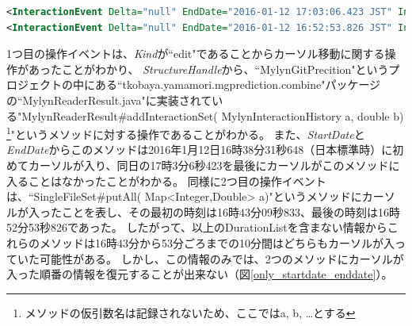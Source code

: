 \documentclass[a4paper]{jsbook}
\begin{document}
\begin{lstlisting}[float, floatplacement=tb, style=normalsize, language=xml, caption=拡張されたMylynによって記録されたMylynログの例（ただしXML上で実体参照に変換された文字はもとに戻している）, label=durationlist_fig]
<InteractionEvent Delta="null" EndDate="2016-01-12 17:03:06.423 JST" Interest="15.0" Kind="edit" Navigation="null" OriginId="org.eclipse.jdt.ui.CompilationUnitEditor" StartDate="2016-01-12 16:38:31.648 JST" StructureHandle="=MylynGitPrediction/src<tkobaya.yamamori.mgprediction.combine{MylynReaderResult.java[MylynReaderResult~ addInteractionSet~QMylynInteractionHistory;~D" StructureKind="java" NumEvents="15" CreationCount="103" DurationList= "[2016-01-12 16:38:31.648 JST/2016-01-12 16:40:16.482 JST/modified, 2016-01-12 17:02:58.409 JST/2016-01-12 17:03:06.423 JST/modified]"/>
<InteractionEvent Delta="null" EndDate="2016-01-12 16:52:53.826 JST" Interest="29.0" Kind="edit" Navigation="null" OriginId="org.eclipse.jdt.ui.CompilationUnitEditor" StartDate="2016-01-12 16:43:09.833 JST" StructureHandle="= MylynGitPrediction/src<tkobaya.yamamori.mgprediction.combine{SingleFileSet.java[SingleFileSet~putAll~QMap<+QInteger;+QDouble;>;" StructureKind="java" NumEvents="29" CreationCount="157" DurationList=" [2016-01-12 16:43:09.833 JST/2016-01-12 16:43:11.666 JST/referred, 2016-01-12 16:51:14.131 JST/2016-01-12 16:51:14.131 JST/referred, 2016-01-12 16:51:38.25 JST/2016-01-12 16:52:53.826 JST/modified]"/>
\end{lstlisting}

1つ目の操作イベントは、{\it Kind}が``edit"であることからカーソル移動に関する操作があったことがわかり、
{\it StructureHandle}から、``MylynGitPrecition"というプロジェクトの中にある\newline``tkobaya.yamamori.mgprediction.combine"パッケージの``MylynReaderResult.java"に実装されている"MylynReaderResult\#addInteractionSet( MylynInteractionHistory a, double b)
\footnote{メソッドの仮引数名は記録されないため、ここではa, b, \dots とする}"というメソッドに対する操作であることがわかる。
また、{\it StartDate}と{\it EndDate}からこのメソッドは2016年1月12日16時38分31秒648（日本標準時）に初めてカーソルが入り、同日の17時3分6秒423を最後にカーソルがこのメソッドに入ることはなかったことがわかる。
同様に2つ目の操作イベントは、``SingleFileSet\#putAll( Map<Integer,Double> a)"というメソッドにカーソルが入ったことを表し、その最初の時刻は16時43分09秒833、最後の時刻は16時52分53秒826であった。
したがって、以上のDurationListを含まない情報からこれらのメソッドは16時43分から53分ごろまでの10分間はどちらもカーソルが入っていた可能性がある。
しかし、この情報のみでは、2つのメソッドにカーソルが入った順番の情報を復元することが出来ない（図\ref{only_startdate_enddate}）。
\end{document}
